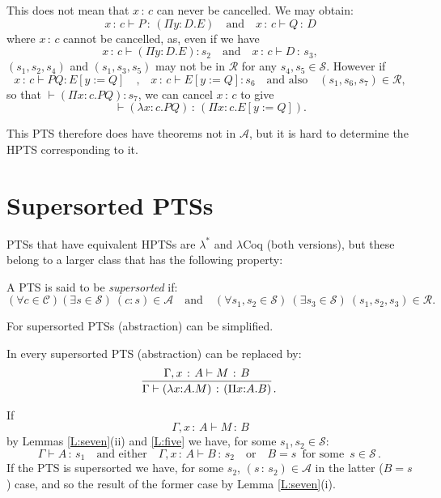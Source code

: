 \documentclass{LMCS}
\def\:{\mathbin{\,:\,}}
\def\.{\mathbin{\,.\,}}
\begin{document}
  This does not mean that $x\:c$ can never be cancelled. We may
  obtain:
\[x\:c\vdash P\:(\Pi y{:}D.E)\quad\mbox{and}\quad x\:c\vdash Q\:D\]
  where $x\:c$ cannot be cancelled, as, even if we have
\[x\:c\vdash (\Pi y{:}D.E):s_2\quad\mbox{and}\quad x\:c\vdash D\:s_3,\]
  $(s_1, s_2, s_4)$ and $(s_1, s_3, s_5)$ may not be in $\mathcal R$
  for any $s_4, s_5\in\mathcal S$. However if
\[x\:c\vdash PQ:E [y:=Q]\quad\mbox{,}\quad x\:c\vdash E[y:=Q]:s_6
 \quad\mbox{and also}\quad(s_1, s_6, s_7)\in\mathcal R,
\]
  so that $\vdash(\Pi x{:}c.PQ):s_7$, we can cancel $x\:c$ to give
\[\vdash(\lambda x{:}c.PQ)\:(\Pi x{:}c.E[y:=Q]).\]

  This PTS therefore does have theorems not in ${\mathcal A}$, but it
  is hard to determine the HPTS corresponding to it.

\section{Supersorted PTSs}\label{S:SupSort}

 \noindent PTSs that have equivalent HPTSs are $\lambda^\ast$ and
  $\lambda $Coq (both versions), but these belong to a larger class
  that has the following property{:}

\begin{defi}[Supersorted]\label{D:supers}

  A PTS is said to be \emph{supersorted} if:
\[(\forall c\in {\mathcal C})(\exists s\in {\mathcal S})\ (c:s)\in
  {\mathcal A}
\quad\mbox{and}\quad
  (\forall s_1, s_2\in {\mathcal S})\ (\exists s_3\in {\mathcal
S})\ (s_1,s_2,s_3)\in {\mathcal R}.
\]
\end{defi}

  For supersorted PTSs (abstraction) can be simplified.

\begin{thm}\label{T:sixteen} In every supersorted PTS
  (abstraction) can be replaced by:
\[\infer
{\Gamma\vdash(\lambda x{:}A.M)\:(\Pi x{:}A.B)}{\Gamma, x\:A\vdash
  M\:B}\.
\]
\end{thm}

\proof If
\[\Gamma, x\:A\vdash M\:B\]
  by Lemmas \ref{L:seven}(ii) and \ref{L:five} we have, for some
  $s_1,s_2\in\mathcal S$:
\[\Gamma\vdash A\:s_1\quad\mbox{and either}\quad
 \Gamma, x\:A\vdash B\:s_2
 \quad\mbox{or}\quad B=s\enspace\mbox{for some}\enspace s\in\mathcal S\.
\]
  If the PTS is supersorted we have, for some $s_2$, $(s\:s_2)\in
 \mathcal A$ in the latter ($B=s$) case, and so the result of the
  former case by Lemma \ref{L:seven}(i).
\end{document}
